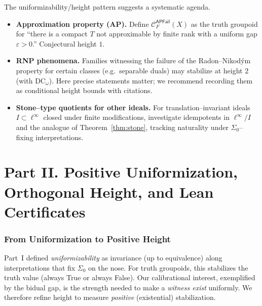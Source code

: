 \documentclass[11pt]{article}
\theoremstyle{definition}
\theoremstyle{remark}
\newcommand{\linf}{\ell^\infty}
\newcommand{\SigmaZero}{\Sigma_{0}}
\begin{document}
The uniformizability/height pattern suggests a systematic agenda.
\begin{itemize}
\item \textbf{Approximation property (AP).} Define \(\mathcal C^{\mathsf{APFail}}_F(X)\) as the truth groupoid for “there is a compact \(T\) not approximable by finite rank with a uniform gap \(\varepsilon>0\).” Conjectural height \(1\).
\item \textbf{RNP phenomena.} Families witnessing the failure of the Radon–Nikodým property for certain classes (e.g.\ separable duals) may stabilize at height \(2\) (with \(\mathrm{DC}_\omega\)). Here precise statements matter; we recommend recording them as conditional height bounds with citations.
\item \textbf{Stone--type quotients for other ideals.} For translation–invariant ideals \(I\subset\linf\) closed under finite modifications, investigate idempotents in \(\linf/I\) and the analogue of Theorem~\ref{thm:stone}, tracking naturality under \(\SigmaZero\)–fixing interpretations.
\end{itemize}

\part*{Part II. Positive Uniformization, Orthogonal Height, and Lean Certificates}

\newcommand{\ULpos}{\mathsf{UL}^{+}}         %
\newcommand{\Frontierpos}{\partial^{+}}      %
\newcommand{\Th}{\mathsf{Th}}
\newcommand{\Axis}{\mathcal{A}}
\newcommand{\Axes}{\mathcal{B}}
\newcommand{\NatSum}{\oplus}                 %

\section{From Uniformization to Positive Height}\label{p2:sec:positive-height}

Part~I defined \emph{uniformizability} as invariance (up to equivalence) along interpretations that fix \(\SigmaZero\) on the nose. For truth groupoids, this stabilizes the truth value (always True or always False). Our calibrational interest, exemplified by the bidual gap, is the strength needed to make a \emph{witness exist} uniformly. We therefore refine height to measure \emph{positive} (existential) stabilization.
\end{document}
